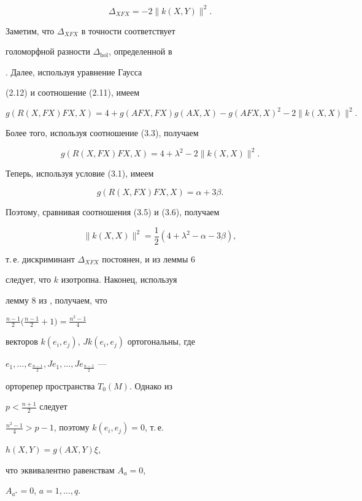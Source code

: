 \begin{pf}
$$


\Delta_{X FX}=-2\|k(X,Y)\|^2.


$$





Заметим, что $\Delta_{X FX}$ в точности соответствует


голоморфной разности $\Delta_{\mathrm{hol}}$, определенной  в


\cite{ONeill}. Далее, используя уравнение Гаусса


(2.12) и соотношение (2.11), имеем


$$


g(R(X,FX)FX,X)=4+g(AFX,FX)g(AX,X)-g(AFX,X)^2-2\|k(X,X)\|^2.


$$


Более того, используя соотношение (3.3), получаем


\begin{equation}


g(R(X,FX)FX,X)=4+\lambda^2-2\|k(X,X)\|^2.


\end{equation}


Теперь, используя  условие (3.1), имеем


\begin{equation}


g(R(X,FX)FX,X)=\alpha+3\beta.


\end{equation}


Поэтому, сравнивая соотношения (3.5) и (3.6), получаем


$$


\|k(X,X)\|^2=\dfrac{1}{2}(4+\lambda^2-\alpha-3\beta),


$$


т.\,е. дискриминант $\Delta_{X FX}$ постоянен, и из леммы 6


\cite{ONeill} следует, что $k$ изотропна. Наконец, используя


лемму 8 из \cite{ONeill}, получаем, что


$\frac{n-1}{2}\big(\frac{n-1}{2}+1\big)=\frac{n^2-1}{4}$


векторов $k(e_i,e_j)$, $Jk(e_i,e_j)$ ортогональны, где


$e_1,\dotsc,e_{\frac{n-1}{2}},Je_1,\dotsc,Je_{\frac{n-1}{2}}$ ---


орторепер пространства $T_0(M)$. Однако из


$p<\frac{n+1}{2}$ следует


$\frac{n^2-1}{4}>p-1$, поэтому $k(e_i,e_j)=0$, т.\,е.


$h(X,Y)=g(AX,Y)\xi$,


что эквивалентно равенствам $A_a=0$,


$A_{a^*}=0$, $a=1,\dotsc,q$.


\end{pf}








